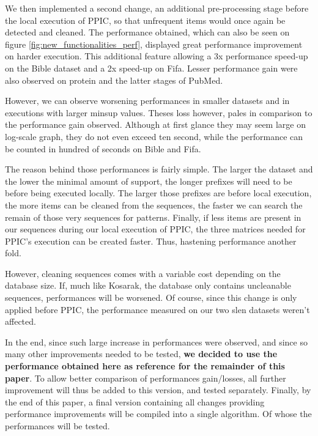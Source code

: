 \documentclass{eplmastersthesis}
\begin{document}
We then implemented a second change, an additional pre-processing stage before the local execution of PPIC, so that unfrequent items would once again be detected and cleaned. The performance obtained, which can also be seen on figure \ref{fig:new_functionalities_perf}, displayed great performance improvement on harder execution. This additional feature allowing a 3x performance speed-up on the Bible dataset and a 2x speed-up on Fifa. Lesser performance gain were also observed on protein and the latter stages of PubMed. \newline

However, we can observe worsening performances in smaller datasets and in executions with larger minsup values. Theses loss however, pales in comparison to the performance gain observed. Although at first glance they may seem large on log-scale graph, they do not even exceed ten second, while the performance can be counted in hundred of seconds on Bible and Fifa. \newline

The reason behind those performances is fairly simple. The larger the dataset and the lower the minimal amount of support, the longer prefixes will need to be before being executed locally. The larger those prefixes are before local execution, the more items can be cleaned from the sequences, the faster we can search the remain of those very sequences for patterns. Finally, if less items are present in our sequences during our local execution of PPIC, the three matrices needed for PPIC's execution can be created faster. Thus, hastening performance another fold. \newline

However, cleaning sequences comes with a variable cost depending on the database size. If, much like Kosarak, the database only contains uncleanable sequences, performances will be worsened. Of course, since this change is only applied before PPIC, the performance measured on our two slen datasets weren't affected. \newline

In the end, since such large increase in performances were observed, and since so many other improvements needed to be tested, \textbf{we decided to use the performance obtained here as reference for the remainder of this paper}. To allow better comparison of performances gain/losses, all further improvement will thus be added to this version, and tested separately. Finally, by the end of this paper, a final version containing all changes providing performance improvements will be compiled into a single algorithm. Of whose the performances will be tested.
\end{document}
